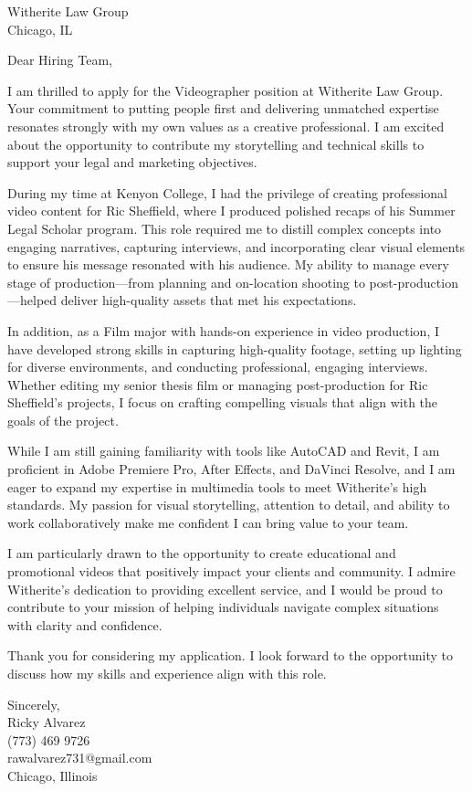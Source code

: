 \documentclass[a4paper,10pt]{letter}
\begin{document}
\begin{letter}{Witherite Law Group \\
Chicago, IL}

\opening{Dear Hiring Team,}

I am thrilled to apply for the Videographer position at Witherite Law Group. Your commitment to putting people first and delivering unmatched expertise resonates strongly with my own values as a creative professional. I am excited about the opportunity to contribute my storytelling and technical skills to support your legal and marketing objectives.

During my time at Kenyon College, I had the privilege of creating professional video content for Ric Sheffield, where I produced polished recaps of his Summer Legal Scholar program. This role required me to distill complex concepts into engaging narratives, capturing interviews, and incorporating clear visual elements to ensure his message resonated with his audience. My ability to manage every stage of production—from planning and on-location shooting to post-production—helped deliver high-quality assets that met his expectations.

In addition, as a Film major with hands-on experience in video production, I have developed strong skills in capturing high-quality footage, setting up lighting for diverse environments, and conducting professional, engaging interviews. Whether editing my senior thesis film or managing post-production for Ric Sheffield’s projects, I focus on crafting compelling visuals that align with the goals of the project.

While I am still gaining familiarity with tools like AutoCAD and Revit, I am proficient in Adobe Premiere Pro, After Effects, and DaVinci Resolve, and I am eager to expand my expertise in multimedia tools to meet Witherite’s high standards. My passion for visual storytelling, attention to detail, and ability to work collaboratively make me confident I can bring value to your team.

I am particularly drawn to the opportunity to create educational and promotional videos that positively impact your clients and community. I admire Witherite’s dedication to providing excellent service, and I would be proud to contribute to your mission of helping individuals navigate complex situations with clarity and confidence.

Thank you for considering my application. I look forward to the opportunity to discuss how my skills and experience align with this role.

\vspace{1em}

Sincerely, \\
Ricky Alvarez \\
(773) 469 9726 \\
rawalvarez731@gmail.com \\
Chicago, Illinois

\end{letter}
\end{document}
